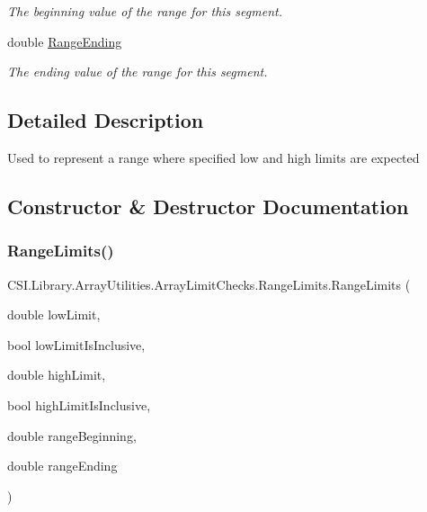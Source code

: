 \begin{DoxyCompactItemize}
\begin{DoxyCompactList}\small\item\em The beginning value of the range for this segment. \end{DoxyCompactList}\item 
double \mbox{\hyperlink{class_c_s_i_1_1_library_1_1_array_utilities_1_1_array_limit_checks_1_1_range_limits_a6a02387651b66e1ccb7cb63e6de5d793}{Range\+Ending}}
\begin{DoxyCompactList}\small\item\em The ending value of the range for this segment. \end{DoxyCompactList}\end{DoxyCompactItemize}


\subsection{Detailed Description}
Used to represent a range where specified low and high limits are expected 



\subsection{Constructor \& Destructor Documentation}
\mbox{\label{class_c_s_i_1_1_library_1_1_array_utilities_1_1_array_limit_checks_1_1_range_limits_a2073071423e6fa0a1026249c823f3b5f}} 
\subsubsection{\texorpdfstring{RangeLimits()}{RangeLimits()}}
{\footnotesize\ttfamily C\+S\+I.\+Library.\+Array\+Utilities.\+Array\+Limit\+Checks.\+Range\+Limits.\+Range\+Limits (\begin{DoxyParamCaption}\item[{double}]{low\+Limit,  }\item[{bool}]{low\+Limit\+Is\+Inclusive,  }\item[{double}]{high\+Limit,  }\item[{bool}]{high\+Limit\+Is\+Inclusive,  }\item[{double}]{range\+Beginning,  }\item[{double}]{range\+Ending }\end{DoxyParamCaption})\hspace{0.3cm}{\ttfamily [inline]}}



